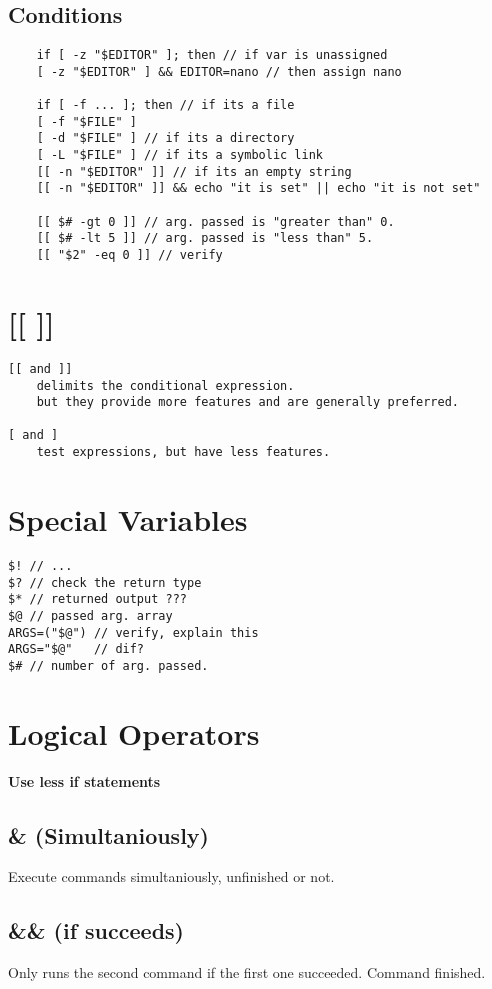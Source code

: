     \subsection{Conditions}
\begin{verbatim}
    if [ -z "$EDITOR" ]; then // if var is unassigned
    [ -z "$EDITOR" ] && EDITOR=nano // then assign nano

    if [ -f ... ]; then // if its a file
    [ -f "$FILE" ] 
    [ -d "$FILE" ] // if its a directory
    [ -L "$FILE" ] // if its a symbolic link 
    [[ -n "$EDITOR" ]] // if its an empty string
    [[ -n "$EDITOR" ]] && echo "it is set" || echo "it is not set"

    [[ $# -gt 0 ]] // arg. passed is "greater than" 0.
    [[ $# -lt 5 ]] // arg. passed is "less than" 5.
    [[ "$2" -eq 0 ]] // verify 
\end{verbatim}

\section{[[ ]]}

\begin{verbatim}
[[ and ]] 
    delimits the conditional expression. 
    but they provide more features and are generally preferred.

[ and ]
    test expressions, but have less features.
\end{verbatim}

\section{Special Variables}
\begin{verbatim}
$! // ... 
$? // check the return type
$* // returned output ???
$@ // passed arg. array 
ARGS=("$@") // verify, explain this
ARGS="$@"   // dif?
$# // number of arg. passed.
\end{verbatim}

\section{Logical Operators}

\textbf{Use less if statements}

    \subsection{\& (Simultaniously)}
        Execute commands simultaniously, unfinished or not.
    \subsection{\&\& (if succeeds)}
        Only runs the second command if the first one succeeded.
        Command finished.

